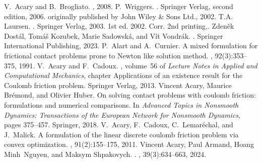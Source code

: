 \documentclass[10pt]{icccm2025}
\begin{document}

\vspace{-1.5ex}
\small
%
\begin{thebibliography}{1}
V.~Acary and B.~Brogliato.
, 2008.
\vspace{-1.5ex}
P.~Wriggers.
.
\newblock Springer Verlag, second edition, 2006.
\newblock originally published by John Wiley \& Sons Ltd., 2002.
\vspace{-1.5ex}
T.A. Laursen.
.
\newblock Springer Verlag, 2003.
\newblock 1st ed. 2002. Corr. 2nd printing,.
\vspace{-1.5ex}
Zdeněk Dostál, Tomáš Kozubek, Marie Sadowská, and Vít Vondrák.
.
\newblock Springer International Publishing, 2023.
\vspace{-1.5ex}
P.~Alart and A.~Curnier.
\newblock A mixed formulation for frictional contact problems prone to
  \uppercase{N}ewton like solution method.
,
  92(3):353--375, 1991.
\vspace{-1.5ex}
V.~Acary and F.~Cadoux.
, volume~56 of {\em Lecture Notes in Applied and Computational
  Mechanics}, chapter Applications of an existence result for the {C}oulomb
  friction problem.
\newblock Springer Verlag, 2013.
\vspace{-1.5ex}
Vincent Acary, Maurice Br{\'e}mond, and Olivier Huber.
\newblock On solving contact problems with coulomb friction: formulations and
  numerical comparisons.
\newblock In {\em Advanced Topics in Nonsmooth Dynamics: Transactions of the
  European Network for Nonsmooth Dynamics}, pages 375--457. Springer, 2018.
\vspace{-1.5ex}
V.~Acary, F.~Cadoux, C.~Lemar\'echal, and J.~Malick.
\newblock A formulation of the linear discrete coulomb friction problem via
  convex optimization.
, 91(2):155--175, 2011.
  \vspace{-1.5ex}
Vincent Acary, Paul Armand, Hoang Minh~Nguyen, and Maksym Shpakovych.
.
, 39(3):634--663, 2024.
\end{thebibliography}
\end{document}
